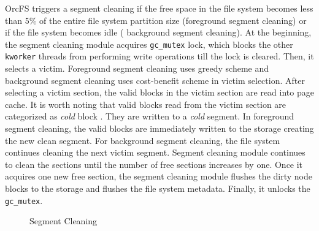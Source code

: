 \documentclass[pageno]{jpaper}
\begin{document}
OrcFS triggers a segment cleaning if the free space in the file system
becomes less than 5\% of the entire file system partition size
(foreground segment cleaning) or if the file system becomes idle (
background segment cleaning). At the beginning, the segment cleaning
module acquires \texttt{gc\_mutex} lock, which blocks the other
\texttt{kworker} threads from performing write operations till the
lock is cleared. Then, it selects a victim. Foreground
segment cleaning uses greedy \cite{kawaguchi1995Flash} scheme and
background segment cleaning uses cost-benefit
\cite{rosenblum1992design} scheme in victim selection. After selecting
a victim section, the valid blocks in the victim section are read into
page cache. It is worth noting that valid blocks read from the victim
section are categorized as \emph{cold} block \cite{lee2015f2fs}. They
are written to a \emph{cold} segment. In foreground segment cleaning,
the valid blocks are immediately written to the storage creating the
new clean segment. For background segment cleaning, the file system
continues cleaning the next victim segment.  Segment cleaning module
continues to clean the sections until the number of free sections
increases by one. Once it acquires one new free section, the segment
cleaning module flushes the dirty node blocks to the storage and
flushes the file system metadata. Finally, it unlocks the
\texttt{gc\_mutex}.


\begin{figure}[t]
\centering
 \hspace{-1.3em}
 \caption{Segment Cleaning}
 \label{fig:quasi_sc}
\end{figure}
\end{document}
